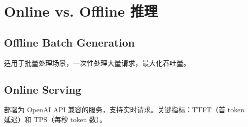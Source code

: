 \section{Online vs. Offline 推理}
\subsection{Offline Batch Generation}
适用于批量处理场景，一次性处理大量请求，最大化吞吐量。

\subsection{Online Serving}
部署为 OpenAI API 兼容的服务，支持实时请求。关键指标：TTFT（首 token 延迟）和 TPS（每秒 token 数）。

